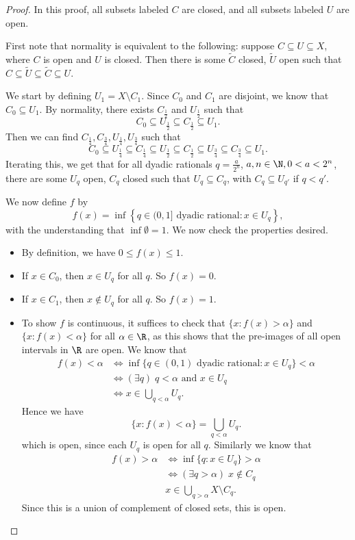 \documentclass[a4paper]{article}
\begin{document}
\begin{proof}
  In this proof, all subsets labeled $C$ are closed, and all subsets labeled $U$ are open.

  First note that normality is equivalent to the following: suppose $C \subseteq U \subseteq X$, where $C$ is open and $U$ is closed. Then there is some $\tilde{C}$ closed, $\tilde{U}$ open such that $C\subseteq \tilde{U} \subseteq \tilde{C} \subseteq U$.

  We start by defining $U_1 = X \setminus C_1$. Since $C_0$ and $C_1$ are disjoint, we know that $C_0 \subseteq U_1$. By normality, there exists $C_{\frac{1}{2}}$ and $U_{\frac{1}{2}}$ such that
  \[
    C_0 \subseteq U_{\frac{1}{2}} \subseteq C_{\frac{1}{2}} \subseteq U_1.
  \]
  Then we can find $C_{\frac{1}{4}}, C_{\frac{3}{4}}, U_{\frac{1}{4}}, U_{\frac{3}{4}}$ such that
  \[
    C_0 \subseteq U_{\frac{1}{4}}\subseteq C_{\frac{1}{4}} \subseteq U_{\frac{1}{2}} \subseteq C_{\frac{1}{2}} \subseteq U_{\frac{3}{4}} \subseteq C_{\frac{3}{4}} \subseteq U_1.
  \]
  Iterating this, we get that for all dyadic rationals $q = \frac{a}{2^n}$, $a, n\in \N, 0 < a < 2^n$, there are some $U_q$ open, $C_q$ closed such that $U_q \subseteq C_q$, with $C_q \subseteq U_{q'}$ if $q < q'$.

  We now define $f$ by
  \[
    f(x) = \inf\left\{q \in (0, 1] \text{ dyadic rational}: x \in U_q\right\},
  \]
  with the understanding that $\inf \emptyset = 1$. We now check the properties desired.
  \begin{itemize}
    \item By definition, we have $0 \leq f(x) \leq 1$.
    \item If $x \in C_0$, then $x \in U_q$ for all $q$. So $f(x) = 0$.
    \item If $x \in C_1$, then $x \not\in U_q$ for all $q$. So $f(x) = 1$.
    \item To show $f$ is continuous, it suffices to check that $\{x: f(x) > \alpha\}$ and $\{x: f(x) < \alpha\}$ for all $\alpha \in \R$, as this shows that the pre-images of all open intervals in $\R$ are open. We know that
      \begin{align*}
        f(x) < \alpha &\Leftrightarrow \inf\{q \in (0, 1)\text{ dyadic rational}: x \in U_q\} < \alpha \\
        &\Leftrightarrow (\exists q)\; q < \alpha \text{ and }x \in U_q\\
        &\Leftrightarrow x \in \bigcup_{q < \alpha} U_q.
      \end{align*}
      Hence we have
      \[
        \{x: f(x) < \alpha\} = \bigcup_{q < \alpha} U_q.
      \]
      which is open, since each $U_q$ is open for all $q$. Similarly we know that
      \begin{align*}
        f(x) > \alpha &\Leftrightarrow \inf\{q: x \in U_q\} > \alpha\\
        &\Leftrightarrow (\exists q > \alpha)\; x \not\in C_q\\
        & x \in \bigcup_{q > \alpha} X \setminus C_q.
      \end{align*}
      Since this is a union of complement of closed sets, this is open.
  \end{itemize}
\end{proof}
\end{document}
